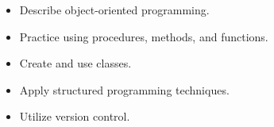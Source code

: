 \begin{itemize}
    \item Describe object-oriented programming.
    \item Practice using procedures, methods, and functions.
    \item Create and use classes.
    \item Apply structured programming techniques.
    \item Utilize version control.
\end{itemize}

